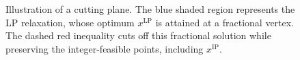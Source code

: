 \begin{figure}[htbp]
\caption{Illustration of a cutting plane. The blue shaded region represents the LP relaxation, whose optimum $x^{\mathrm{LP}}$ is attained at a fractional vertex. The dashed red inequality cuts off this fractional solution while preserving the integer-feasible points, including $x^{\mathrm{IP}}$.}
\label{fig:cutting_plane}
\end{figure}